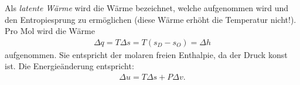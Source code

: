 \begin{summary}
Als \emph{latente Wärme} wird die Wärme bezeichnet, welche aufgenommen wird und den Entropiesprung zu ermöglichen (diese Wärme erhöht die Temperatur nicht!). Pro Mol wird die Wärme
\begin{align*}
    \Delta q = T\Delta s = T(s_D-s_O) = \Delta h
\end{align*}
aufgenommen. Sie entspricht der molaren freien Enthalpie, da der Druck konst ist.
Die Energieänderung entspricht:
\begin{align*}
    \Delta u=T\Delta s+P\Delta v.
\end{align*}
\end{summary}